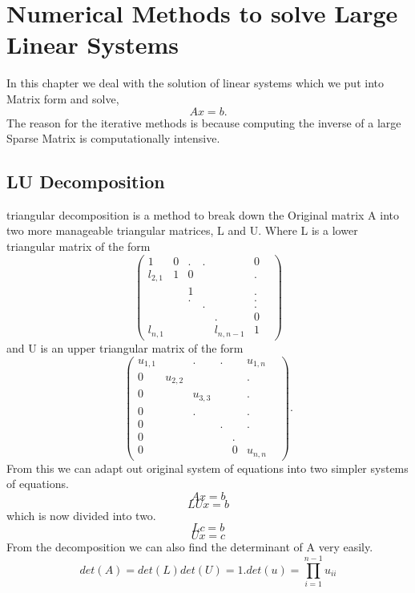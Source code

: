 \chapter{Numerical Methods to solve Large Linear Systems}
In this chapter we deal with the solution of linear systems which we put into Matrix form and solve, 
\begin{equation} Ax=b.
\end{equation} 
The reason for the iterative methods is because computing the inverse of a large Sparse Matrix is computationally intensive.

\section{LU Decomposition}
 triangular decomposition is a method to break down the Original matrix A into two more
manageable triangular matrices, L and U.  Where L is a lower triangular matrix of the form
\[
\left( \begin{array}{ccccccc}
    1 & 0 &. &. & &0 &\\
    l_{2,1} & 1 &0 & & &. &\\
     &  & 1 & & &. &\\
     &  & . & & &. &\\
     &  &  &. & &. &\\
     &  &  & &. &0 &\\
    l_{n,1} &  &  &  &l_{n,n-1} &1 &\end{array} \right)
\]
and U is an upper triangular matrix of the form
\[
\left( \begin{array}{ccccccc}
    u_{1,1} &  &. &. & &u_{1,n}\\
    0 & u_{2,2} & & & &. &\\
     0&  & u_{3,3} & & &. &\\
     0&  & . & & &. &\\
     0&  &  &. & &. &\\
     0&  &  & &. & &\\
    0 &  &  &  &0 &u_{n,n} &\end{array} \right).
\]
From this we can adapt out original system of equations into two simpler systems
of equations.
\[Ax=b\]
\[LUx=b\]
which is now divided into two.
\[Lc=b \]
\[Ux=c \]
From the decomposition we can also find the determinant of A very easily.
\[det(A)=det(L)det(U)=1.det(u)=\prod_{i=1}^{n-1}u_{ii} \]
